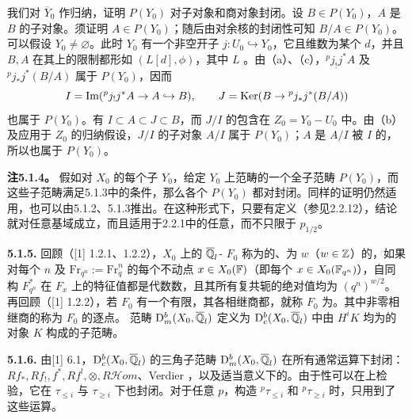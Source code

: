 我们对 $\overline Y_0$ 作归纳，证明 $P(Y_0)$ 对子对象和商对象封闭。设 $B\in P(Y_0)$，$A$ 是 $B$ 的子对象。须证明 $A\in P(Y_0)$；随后由对余核的封闭性可知 $B/A\in P(Y_0)$。
可以假设 $Y_0\ne\varnothing$。此时 $Y_0$ 有一个非空开子 $j:U_0\hookrightarrow Y_0$，它且维数为某个 $d$，并且 $B,A$ 在其上的限制都形如 $(L[d],\phi)$，其中 $L$ 。由（a）、（c），${}^pj_!j^*A$ 及 ${}^pj_*j^*(B/A)$ 属于 $P(Y_0)$，因而
\[
I=\operatorname{Im}({}^pj_!j^*A\to A\hookrightarrow B),\qquad
J=\operatorname{Ker}(B\to{}^pj_*j^*(B/A))
\]
也属于 $P(Y_0)$。有 $I\subset A\subset J\subset B$，而 $J/I$ 的包含在 $Z_0=Y_0-U_0$ 中。由（b）及应用于 $Z_0$ 的归纳假设，$J/I$ 的子对象 $A/I$ 属于 $P(Y_0)$；$A$ 是 $A/I$ 被 $I$ 的，所以也属于 $P(Y_0)$。

\par\medskip\noindent\textbf{注5.1.4。} 假如对 $X_0$ 的每个子 $Y_0$，给定 $Y_0$ 上范畴的一个全子范畴 $P(Y_0)$，而这些子范畴满足5.1.3中的条件，那么各个 $P(Y_0)$ 都对封闭。同样的证明仍然适用，也可以由5.1.2、5.1.3推出。在这种形式下，只要有定义（参见2.2.12），结论就对任意基域成立，而且适用于2.2.1中的任意，而不只限于 $p_{1/2}$。

\par\medskip\noindent\textbf{5.1.5.} 回顾（[1] 1.2.1、1.2.2），$X_0$ 上的 $\overline{\mathbb Q}_l$- $F_0$
称为的、为 $w$（$w\in\mathbb Z$）的，如果对每个 $n$ 及 $\mathrm{Fr}_{q^n}:=\mathrm{Fr}_q^n$ 的每个不动点 $x\in X_0(\mathbb F)$（即每个 $x\in X_0(\mathbb F_{q^n})$），自同构 $F_{q^n}^*$ 在 $F_x$ 上的特征值都是代数数，且其所有复共轭的绝对值均为 $(q^n)^{w/2}$。再回顾（[1] 1.2.2），若 $F_0$ 有一个有限，其各相继商都，就称 $F_0$ 为。其中非零相继商的称为 $F_0$ 的逐点。
范畴 $\mathrm{D}_m^b(X_0,\overline{\mathbb Q}_l)$ 定义为 $\mathrm{D}_c^b(X_0,\overline{\mathbb Q}_l)$ 中由 $H^iK$ 均为的对象 $K$ 构成的子范畴。

\par\medskip\noindent\textbf{5.1.6.} 由[1] 6.1，$\mathrm{D}_c^b(X_0,\overline{\mathbb Q}_l)$ 的三角子范畴 $\mathrm{D}_m^b(X_0,\overline{\mathbb Q}_l)$ 在所有通常运算下封闭：$Rf_*,Rf_!,f^*,Rf^!,\otimes,R\mathcal Hom$、Verdier ，以及适当意义下的。由于性可以在上检验，它在 $\tau_{\le i}$ 与 $\tau_{\ge i}$ 下也封闭。对于任意 $p$，构造 ${}^p\tau_{\le i}$ 和 ${}^p\tau_{\ge i}$ 时，只用到了这些运算。

